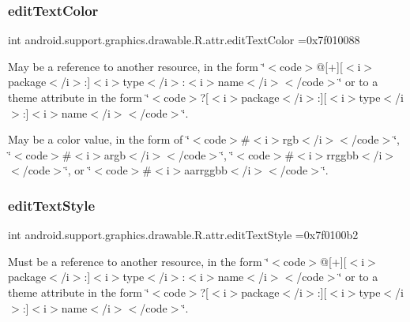 \subsubsection{\texorpdfstring{edit\+Text\+Color}{editTextColor}}
{\footnotesize\ttfamily int android.\+support.\+graphics.\+drawable.\+R.\+attr.\+edit\+Text\+Color =0x7f010088\hspace{0.3cm}{\ttfamily [static]}}

May be a reference to another resource, in the form \char`\"{}$<$code$>$@\mbox{[}+\mbox{]}\mbox{[}$<$i$>$package$<$/i$>$\+:\mbox{]}$<$i$>$type$<$/i$>$\+:$<$i$>$name$<$/i$>$$<$/code$>$\char`\"{} or to a theme attribute in the form \char`\"{}$<$code$>$?\mbox{[}$<$i$>$package$<$/i$>$\+:\mbox{]}\mbox{[}$<$i$>$type$<$/i$>$\+:\mbox{]}$<$i$>$name$<$/i$>$$<$/code$>$\char`\"{}. 

May be a color value, in the form of \char`\"{}$<$code$>$\#$<$i$>$rgb$<$/i$>$$<$/code$>$\char`\"{}, \char`\"{}$<$code$>$\#$<$i$>$argb$<$/i$>$$<$/code$>$\char`\"{}, \char`\"{}$<$code$>$\#$<$i$>$rrggbb$<$/i$>$$<$/code$>$\char`\"{}, or \char`\"{}$<$code$>$\#$<$i$>$aarrggbb$<$/i$>$$<$/code$>$\char`\"{}. \mbox{\label{classandroid_1_1support_1_1graphics_1_1drawable_1_1R_1_1attr_aa3d01d8957e3bf9ec7eddbb57415ef47}} 
\subsubsection{\texorpdfstring{edit\+Text\+Style}{editTextStyle}}
{\footnotesize\ttfamily int android.\+support.\+graphics.\+drawable.\+R.\+attr.\+edit\+Text\+Style =0x7f0100b2\hspace{0.3cm}{\ttfamily [static]}}

Must be a reference to another resource, in the form \char`\"{}$<$code$>$@\mbox{[}+\mbox{]}\mbox{[}$<$i$>$package$<$/i$>$\+:\mbox{]}$<$i$>$type$<$/i$>$\+:$<$i$>$name$<$/i$>$$<$/code$>$\char`\"{} or to a theme attribute in the form \char`\"{}$<$code$>$?\mbox{[}$<$i$>$package$<$/i$>$\+:\mbox{]}\mbox{[}$<$i$>$type$<$/i$>$\+:\mbox{]}$<$i$>$name$<$/i$>$$<$/code$>$\char`\"{}. \mbox{\label{classandroid_1_1support_1_1graphics_1_1drawable_1_1R_1_1attr_aacf78f2c814c1727339551d5c60e71e4}} 
